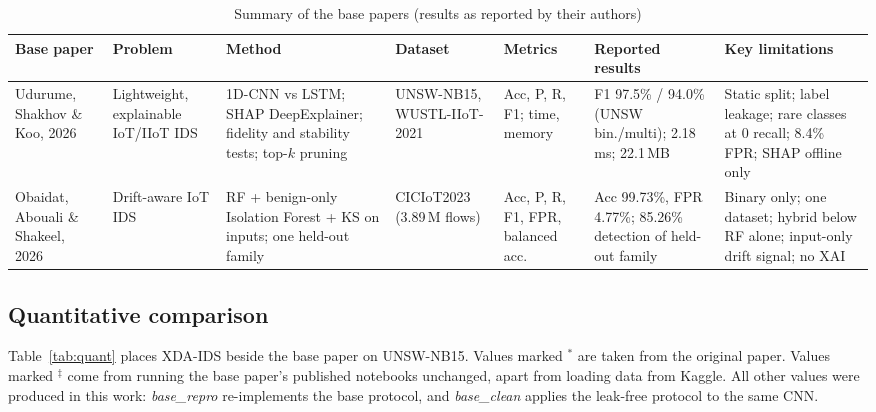 \documentclass[conference]{IEEEtran}
\begin{document}
\begin{table}[t]
\caption{Summary of the base papers (results as reported by their authors)}
\label{tab:base}
\centering\footnotesize
\begin{tabular}{@{}L{2.3cm}L{2.4cm}L{2.7cm}L{2.0cm}L{2.0cm}L{2.5cm}L{2.9cm}@{}}
\toprule
Base paper & Problem & Method & Dataset & Metrics & Reported results & Key limitations \\
\midrule
Udurume, Shakhov \& Koo, 2026~\cite{udurume2026} & Lightweight, explainable IoT/IIoT IDS & 1D-CNN vs LSTM; SHAP DeepExplainer; fidelity and stability tests; top-$k$ pruning & UNSW-NB15, WUSTL-IIoT-2021 & Acc, P, R, F1; time, memory & F1 97.5\% / 94.0\% (UNSW bin./multi); 2.18\,ms; 22.1\,MB & Static split; label leakage; rare classes at 0 recall; 8.4\% FPR; SHAP offline only \\
Obaidat, Abouali \& Shakeel, 2026~\cite{obaidat2026} & Drift-aware IoT IDS & RF + benign-only Isolation Forest + KS on inputs; one held-out family & CICIoT2023 (3.89\,M flows) & Acc, P, R, F1, FPR, balanced acc. & Acc 99.73\%, FPR 4.77\%; 85.26\% detection of held-out family & Binary only; one dataset; hybrid below RF alone; input-only drift signal; no XAI \\
\bottomrule
\end{tabular}
\end{table}

\subsection{Quantitative comparison}
Table~\ref{tab:quant} places XDA-IDS beside the base paper on UNSW-NB15. Values marked $^{*}$ are taken from the original paper. Values marked $^{\ddagger}$ come from running the base paper's published notebooks unchanged, apart from loading data from Kaggle. All other values were produced in this work: \textit{base\_repro} re-implements the base protocol, and \textit{base\_clean} applies the leak-free protocol to the same CNN.
\end{document}
